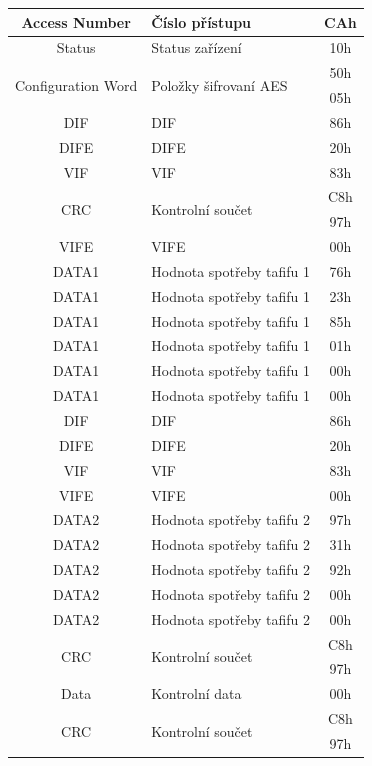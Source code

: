 \begin{table}[!ht]
{\begin{tabular}{|c|l|c|}
Access Number & Číslo přístupu & CAh \\ \hline
Status & Status zařízení & 10h \\ \hline
\multirow{2}{*}{Configuration Word} & \multirow{2}{*}{Položky šifrovaní AES} & 50h \\ \cline{3-3}
 &  & 05h \\ \hline
DIF & DIF & 86h \\ \hline
DIFE & DIFE & 20h \\ \hline
VIF & VIF & 83h \\ \hline
\multirow{2}{*}{CRC}  & \multirow{2}{*}{Kontrolní součet}  & C8h \\ \cline{3-3}
 &  & 97h \\ \hline
VIFE & VIFE & 00h \\ \hline
DATA1 & Hodnota spotřeby tafifu 1 & 76h \\ \hline
DATA1 & Hodnota spotřeby tafifu 1 & 23h \\ \hline
DATA1 & Hodnota spotřeby tafifu 1 & 85h \\ \hline
DATA1 & Hodnota spotřeby tafifu 1 & 01h \\ \hline
DATA1 & Hodnota spotřeby tafifu 1 & 00h \\ \hline
DATA1 & Hodnota spotřeby tafifu 1 & 00h \\ \hline
DIF & DIF & 86h \\ \hline
DIFE & DIFE & 20h \\ \hline
VIF & VIF & 83h \\ \hline
VIFE & VIFE & 00h \\ \hline
DATA2 & Hodnota spotřeby tafifu 2 & 97h \\ \hline
DATA2 & Hodnota spotřeby tafifu 2 & 31h \\ \hline
DATA2 & Hodnota spotřeby tafifu 2 & 92h \\ \hline
DATA2 & Hodnota spotřeby tafifu 2 & 00h \\ \hline
DATA2 & Hodnota spotřeby tafifu 2 & 00h \\ \hline
\multirow{2}{*}{CRC}  & \multirow{2}{*}{Kontrolní součet}  & C8h \\ \cline{3-3}
 &  & 97h \\ \hline
Data & Kontrolní data & 00h \\ \hline
\multirow{2}{*}{CRC}  & \multirow{2}{*}{Kontrolní součet}  & C8h \\ \cline{3-3}
 &  & 97h \\ \hline
\end{tabular}}
\end{table}



